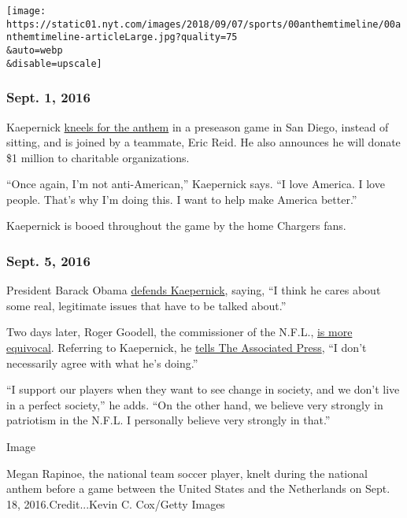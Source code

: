 \texttt{[image: https://static01.nyt.com/images/2018/09/07/sports/00anthemtimeline/00anthemtimeline-articleLarge.jpg?quality=75\\\&auto=webp\\\&disable=upscale]}

\hypertarget{sept-1-2016}{%
\subsubsection{\texorpdfstring{\textbf{Sept. 1},
2016}{Sept. 1, 2016}}\label{sept-1-2016}}

Kaepernick
\href{https://www.nytimes.com/2016/09/02/sports/football/colin-kaepernick-kneels-national-anthem-protest.html}{kneels
for the anthem} in a preseason game in San Diego, instead of sitting,
and is joined by a teammate, Eric Reid. He also announces he will donate
\$1 million to charitable organizations.

``Once again, I'm not anti-American,'' Kaepernick says. ``I love
America. I love people. That's why I'm doing this. I want to help make
America better.''

Kaepernick is booed throughout the game by the home Chargers fans.

\hypertarget{sept-5-2016}{%
\subsubsection{\texorpdfstring{\textbf{Sept. 5,
2016}}{Sept. 5, 2016}}\label{sept-5-2016}}

President Barack Obama
\href{https://www.nytimes.com/2016/09/06/sports/obama-colin-kaepernick-national-anthem.html}{defends
Kaepernick}, saying, ``I think he cares about some real, legitimate
issues that have to be talked about.''

Two days later, Roger Goodell, the commissioner of the N.F.L.,
\href{https://www.nytimes.com/2016/09/08/sports/football/colin-kaepernick-anthem-protest-nfl-roger-goodell.html}{is
more equivocal}. Referring to Kaepernick, he
\href{https://pro32.ap.org/article/goodell-doesnt-agree-kaepernicks-actions}{tells
The Associated Press}, ``I don't necessarily agree with what he's
doing.''

``I support our players when they want to see change in society, and we
don't live in a perfect society,'' he adds. ``On the other hand, we
believe very strongly in patriotism in the N.F.L. I personally believe
very strongly in that.''

Image

Megan Rapinoe, the national team soccer player, knelt during the
national anthem before a game between the United States and the
Netherlands on Sept. 18, 2016.Credit...Kevin C. Cox/Getty Images

